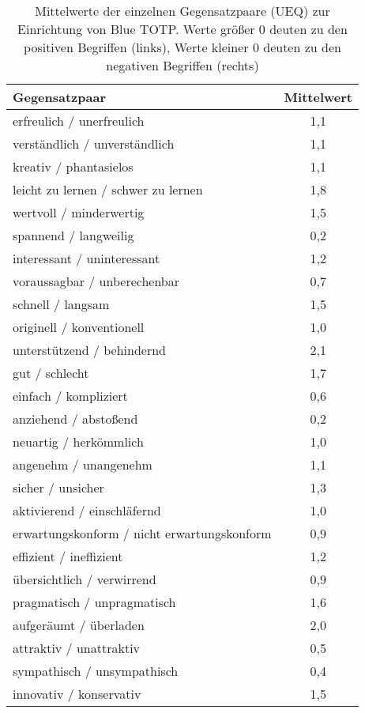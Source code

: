 \begin{table}
    \centering
    \begin{center}
    \begin{tabular}{| l | c |}
        \hline
        \textbf{Gegensatzpaar} & \textbf{Mittelwert} \\
        \hline
        erfreulich / unerfreulich & 1,1 \\  
        \hline
        verständlich / unverständlich & 1,1 \\
        \hline
        kreativ / phantasielos & 1,1 \\
        \hline
        leicht zu lernen / schwer zu lernen & 1,8 \\
        \hline
        wertvoll / minderwertig & 1,5 \\
        \hline
        spannend / langweilig & 0,2 \\
        \hline
        interessant / uninteressant & 1,2 \\
        \hline
        voraussagbar / unberechenbar & 0,7 \\
        \hline
        schnell / langsam & 1,5 \\
        \hline
        originell / konventionell & 1,0 \\
        \hline
        unterstützend / behindernd & 2,1 \\
        \hline
        gut / schlecht & 1,7 \\
        \hline
        einfach / kompliziert & 0,6 \\
        \hline
        anziehend / abstoßend & 0,2 \\
        \hline
        neuartig / herkömmlich & 1,0 \\
        \hline
        angenehm / unangenehm & 1,1 \\
        \hline
        sicher / unsicher & 1,3 \\
        \hline
        aktivierend / einschläfernd & 1,0 \\
        \hline
        erwartungskonform / nicht erwartungskonform & 0,9 \\
        \hline
        effizient / ineffizient & 1,2 \\
        \hline
        übersichtlich / verwirrend & 0,9 \\
        \hline
        pragmatisch / unpragmatisch & 1,6 \\
        \hline
        aufgeräumt / überladen & 2,0 \\
        \hline
        attraktiv / unattraktiv & 0,5 \\
        \hline
        sympathisch / unsympathisch & 0,4 \\
        \hline
        innovativ / konservativ & 1,5 \\
        \hline
    \end{tabular}
    \end{center}
    \caption[Mittelwerte der Gegensatzpaare (UEQ) zur Einrichtung von Blue TOTP]{Mittelwerte der einzelnen Gegensatzpaare (UEQ) zur Einrichtung von Blue TOTP. Werte größer 0 deuten zu den positiven Begriffen (links), Werte kleiner 0 deuten zu den negativen Begriffen (rechts)}
    \label{tab: studie setup ueq item means}
\end{table}
\newpage
